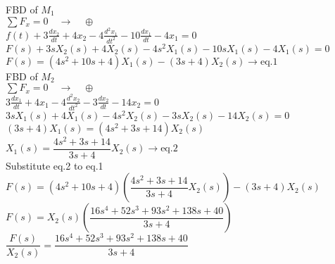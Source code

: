 \documentclass[11pt,letterpaper]{article}
\begin{document}
\begin{center}

FBD of $M_1$\\

$\sum F_x=0 \quad \rightarrow \quad \oplus$\\

$f(t)+3\frac{dx_2}{dt}+4x_2-4\frac{d^2x_1}{dt^2}-10\frac{dx_1}{dt}-4x_1=0$\\

$F(s)+3sX_2(s)+4X_2(s)-4s^2X_1(s)-10sX_1(s)-4X_1(s)=0$\\

$F(s)=(4s^2+10s+4)X_1(s)-(3s+4)X_2(s) \rightarrow \text{eq.1}$\\

FBD of $M_2$\\

$\sum F_x=0 \quad \rightarrow \quad \oplus$\\

$3\frac{dx_1}{dt}+4x_1-4\frac{d^2x_2}{dt^2}-3\frac{dx_2}{dt}-14x_2=0$\\

$3sX_1(s)+4X_1(s)-4s^2X_2(s)-3sX_2(s)-14X_2(s)=0$\\

$(3s+4)X_1(s)=(4s^2+3s+14)X_2(s)$\\

$X_1(s)=\dfrac{4s^2+3s+14}{3s+4}X_2(s) \rightarrow \text{eq.2}$\\

Substitute eq.2 to eq.1\\

$F(s)=(4s^2+10s+4)\left(\dfrac{4s^2+3s+14}{3s+4}X_2(s)\right)-(3s+4)X_2(s)$\\

$F(s)=X_2(s)\left(\dfrac{16s^4+52s^3+93s^2+138s+40}{3s+4}\right)$\\

$\dfrac{F(s)}{X_2(s)}=\dfrac{16s^4+52s^3+93s^2+138s+40}{3s+4}$\\


\end{center}
\end{document}
